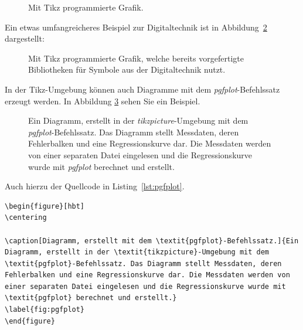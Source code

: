 \begin{figure}[hbt]
	\centering
	
	\caption[Mit Tikz programmierte Grafik.]{Mit Tikz programmierte Grafik.}
	\label{fig:tikz_house}
\end{figure}

Ein etwas umfangreicheres Beispiel zur Digitaltechnik ist in Abbildung~\ref{fig:tikz_digital} dargestellt:

\begin{figure}[hbt]
	\centering
	
	\caption[Mit Tikz programmierte Grafik, welche bereits vorgefertigte Bibliotheken für Symbole aus der Digitaltechnik nutzt.]{Mit Tikz programmierte Grafik, welche bereits vorgefertigte Bibliotheken für Symbole aus der Digitaltechnik nutzt.}
	\label{fig:tikz_digital}
\end{figure}


In der Tikz-Umgebung können auch Diagramme mit dem \textit{pgfplot}-Befehlssatz erzeugt werden. In Abbildung \ref{fig:pgfplot} sehen Sie ein Beispiel.

\begin{figure}[hbt]
	\centering
	
	\caption[Diagramm, erstellt mit dem \textit{pgfplot}-Befehlssatz.]{Ein Diagramm, erstellt in der \textit{tikzpicture}-Umgebung mit dem \textit{pgfplot}-Befehlssatz. Das Diagramm stellt Messdaten, deren Fehlerbalken und eine Regressionskurve dar. Die Messdaten werden von einer separaten Datei eingelesen und die Regressionskurve wurde mit \textit{pgfplot} berechnet und erstellt.}
	\label{fig:pgfplot}
\end{figure}

Auch hierzu der Quellcode in Listing~\ref{lst:pgfplot}.

\begin{minipage}{\linewidth}
\begin{lstlisting}[caption=Quellcode der Abbildung~\ref{fig:pgfplot}.,label=lst:pgfplot]
\begin{figure}[hbt]
\centering

\caption[Diagramm, erstellt mit dem \textit{pgfplot}-Befehlssatz.]{Ein Diagramm, erstellt in der \textit{tikzpicture}-Umgebung mit dem \textit{pgfplot}-Befehlssatz. Das Diagramm stellt Messdaten, deren Fehlerbalken und eine Regressionskurve dar. Die Messdaten werden von einer separaten Datei eingelesen und die Regressionskurve wurde mit \textit{pgfplot} berechnet und erstellt.}
\label{fig:pgfplot}
\end{figure}
\end{lstlisting}
\end{minipage}

